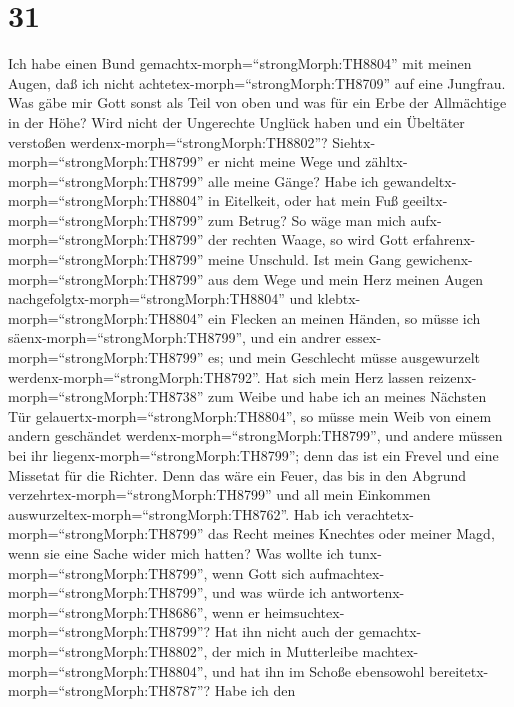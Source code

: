 \hypertarget{section-30}{%
\section{31}\label{section-30}}

 Ich habe einen Bund gemachtx-morph=``strongMorph:TH8804''
mit meinen Augen, daß ich nicht achtetex-morph=``strongMorph:TH8709''
auf eine Jungfrau.  Was gäbe mir Gott sonst als Teil von
oben und was für ein Erbe der Allmächtige in der Höhe?  Wird
nicht der Ungerechte Unglück haben und ein Übeltäter verstoßen
werdenx-morph=``strongMorph:TH8802''? 
Siehtx-morph=``strongMorph:TH8799'' er nicht meine Wege und
zähltx-morph=``strongMorph:TH8799'' alle meine Gänge?  Habe
ich gewandeltx-morph=``strongMorph:TH8804'' in Eitelkeit, oder hat mein
Fuß geeiltx-morph=``strongMorph:TH8799'' zum Betrug?  So
wäge man mich aufx-morph=``strongMorph:TH8799'' der rechten Waage, so
wird Gott erfahrenx-morph=``strongMorph:TH8799'' meine Unschuld.
 Ist mein Gang gewichenx-morph=``strongMorph:TH8799'' aus
dem Wege und mein Herz meinen Augen
nachgefolgtx-morph=``strongMorph:TH8804'' und
klebtx-morph=``strongMorph:TH8804'' ein Flecken an meinen Händen,
 so müsse ich säenx-morph=``strongMorph:TH8799'', und ein
andrer essex-morph=``strongMorph:TH8799'' es; und mein Geschlecht müsse
ausgewurzelt werdenx-morph=``strongMorph:TH8792''.  Hat sich
mein Herz lassen reizenx-morph=``strongMorph:TH8738'' zum Weibe und habe
ich an meines Nächsten Tür gelauertx-morph=``strongMorph:TH8804'',
 so müsse mein Weib von einem andern geschändet
werdenx-morph=``strongMorph:TH8799'', und andere müssen bei ihr
liegenx-morph=``strongMorph:TH8799'';  denn das ist ein
Frevel und eine Missetat für die Richter.  Denn das wäre
ein Feuer, das bis in den Abgrund
verzehrtex-morph=``strongMorph:TH8799'' und all mein Einkommen
auswurzeltex-morph=``strongMorph:TH8762''.  Hab ich
verachtetx-morph=``strongMorph:TH8799'' das Recht meines Knechtes oder
meiner Magd, wenn sie eine Sache wider mich hatten?  Was
wollte ich tunx-morph=``strongMorph:TH8799'', wenn Gott sich
aufmachtex-morph=``strongMorph:TH8799'', und was würde ich
antwortenx-morph=``strongMorph:TH8686'', wenn er
heimsuchtex-morph=``strongMorph:TH8799''?  Hat ihn nicht
auch der gemachtx-morph=``strongMorph:TH8802'', der mich in Mutterleibe
machtex-morph=``strongMorph:TH8804'', und hat ihn im Schoße ebensowohl
bereitetx-morph=``strongMorph:TH8787''?  Habe ich den
